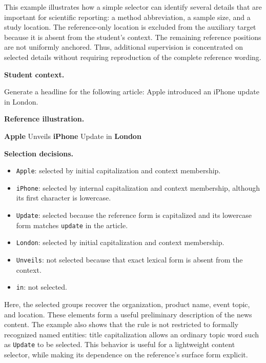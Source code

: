 \documentclass{article} %
\begin{document}
This example illustrates how a simple selector can identify several details that are important for scientific reporting: a method abbreviation, a sample size, and a study location. The reference-only location is excluded from the auxiliary target because it is absent from the student's context. The remaining reference positions are not uniformly anchored. Thus, additional supervision is concentrated on selected details without requiring reproduction of the complete reference wording.

\begin{tcolorbox}[
    colback=gray!5,
    colframe=black!45,
    title={Case 2: News headline generation---entities and mixed-case names},
    breakable,
    fontupper=\small
]
\textbf{Student context.}

Generate a headline for the following article: Apple introduced an iPhone update in London.

\medskip
\textbf{Reference illustration.}

\textbf{Apple} Unveils \textbf{iPhone} Update in \textbf{London}

\medskip
\textbf{Selection decisions.}
\begin{itemize}
    \item \texttt{Apple}: selected by initial capitalization and context membership.
    \item \texttt{iPhone}: selected by internal capitalization and context membership, although its first character is lowercase.
    \item \texttt{Update}: selected because the reference form is capitalized and its lowercase form matches \texttt{update} in the article.
    \item \texttt{London}: selected by initial capitalization and context membership.
    \item \texttt{Unveils}: not selected because that exact lexical form is absent from the context.
    \item \texttt{in}: not selected.
\end{itemize}
\end{tcolorbox}

Here, the selected groups recover the organization, product name, event topic, and location. These elements form a useful preliminary description of the news content. The example also shows that the rule is not restricted to formally recognized named entities: title capitalization allows an ordinary topic word such as \texttt{Update} to be selected. This behavior is useful for a lightweight content selector, while making its dependence on the reference's surface form explicit.
\end{document}

